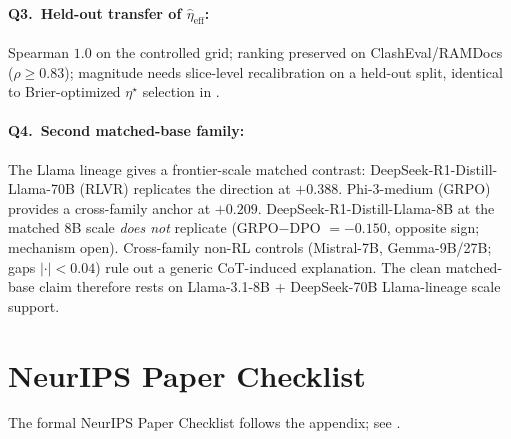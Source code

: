 \paragraph{Q3.\ Held-out transfer of $\hat\eta_{\mathrm{eff}}$:}
Spearman $1.0$ on the controlled grid; ranking preserved on
ClashEval/RAMDocs ($\rho\!\ge\!0.83$); magnitude needs slice-level
recalibration on a held-out split, identical to Brier-optimized
$\eta^\star$ selection in .

\paragraph{Q4.\ Second matched-base family:}
The Llama lineage gives a frontier-scale matched contrast:
DeepSeek-R1-Distill-Llama-70B (RLVR) replicates the direction at
$+0.388$.  Phi-3-medium (GRPO) provides a cross-family anchor at
$+0.209$.  DeepSeek-R1-Distill-Llama-8B at the matched 8B scale
\emph{does not} replicate (GRPO$-$DPO $= -0.150$, opposite sign;
mechanism open).  Cross-family non-RL controls (Mistral-7B,
Gemma-9B/27B; gaps $|\cdot|\!<\!0.04$) rule out a generic
CoT-induced explanation.  The clean matched-base claim therefore
rests on Llama-3.1-8B + DeepSeek-70B Llama-lineage scale support.


\section{NeurIPS Paper Checklist}
\label{app:letter-N}

The formal NeurIPS Paper Checklist follows the appendix; see .

